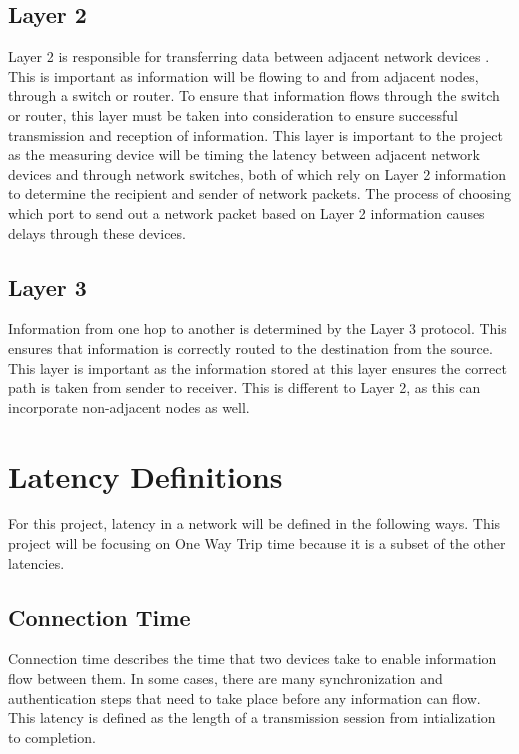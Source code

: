 \subsection{Layer 2}

Layer 2 is responsible for transferring data between adjacent network devices \cite{IEEE802}. This is important as 
information will be flowing to and from adjacent nodes, through a switch or router. To ensure that information flows 
through the switch or router, this layer must be taken into consideration to ensure successful transmission and 
reception of information. This layer is important to the project as the measuring device will be timing the latency 
between adjacent network devices and through network switches, both of which rely on Layer 2 information to determine 
the recipient and sender of network packets. The process of choosing which port to send out a network packet based on 
Layer 2 information causes delays through these devices.

\subsection{Layer 3}

Information from one hop to another is determined by the Layer 3 protocol. This ensures that
information is correctly routed to the destination from the source. This layer is important as the
information stored at this layer ensures the correct path is taken from sender to receiver. This is
different to Layer 2, as this can incorporate non-adjacent nodes as well.

\section{Latency Definitions}

For this project, latency in a network will be defined in the following ways. 
This project will be focusing on One Way Trip time because it is a subset of the other latencies.

\subsection{Connection Time}

Connection time describes the time that two devices take to enable information flow between them. In
some cases, there are many synchronization and authentication steps that need to take place before
any information can flow. This latency is defined as the length of a transmission session from intialization to 
completion.

